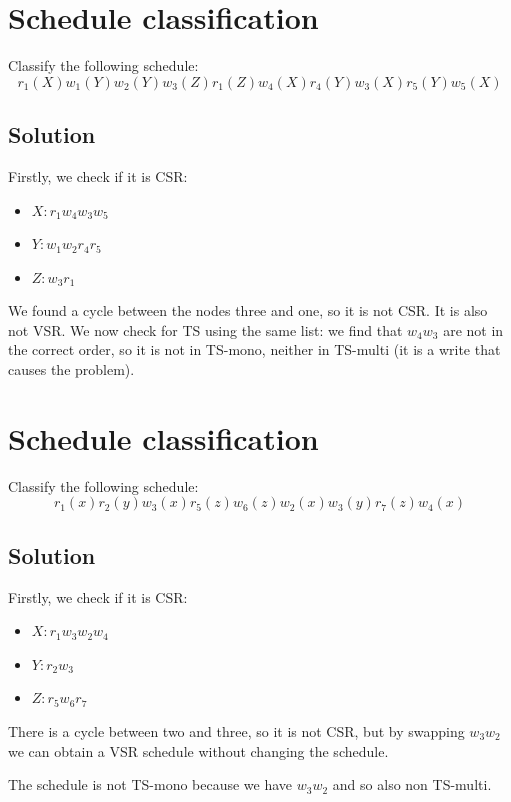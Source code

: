 \documentclass[12pt, a4paper]{report}
\newtheorem[style=M,bodystyle=\normalfont]{theorem}{Theorem}
\newtheorem[style=M,bodystyle=\normalfont]{corollary}{Corollary}
\newtheorem[style=M,bodystyle=\normalfont]{lemma}{Lemma}
\newtheorem[style=M,bodystyle=\normalfont]{definition}{Definition}
\begin{document}
    \newpage

    \section{Schedule classification}
        Classify the following schedule:
        \[r_1(X) w_1(Y) w_2(Y) w_3(Z) r_1(Z) w_4(X) r_4(Y) w_3(X) r_5(Y) w_5(X)\] 
    \subsection*{Solution}
        Firstly, we check if it is CSR:
        \begin{itemize}
            \item $X: r_1 w_4 w_3 w_5$
            \item $Y: w_1 w_2 r_4 r_5$
            \item $Z: w_3 r_1$
        \end{itemize}
        We found a cycle between the nodes three and one, so it is not CSR. It is also not VSR. We now check for TS using the same list: 
        we find that $w_4 w_3$ are not in the correct order, so it is not in TS-mono, neither in TS-multi (it is a write that causes the 
        problem).

    \newpage

    \section{Schedule classification}
        Classify the following schedule:
        \[r_1(x) r_2(y) w_3(x) r_5(z) w_6(z) w_2(x) w_3(y) r_7(z) w_4(x)\] 
    \subsection*{Solution}
        Firstly, we check if it is CSR:
        \begin{itemize}
            \item $X: r_1 w_3 w_2 w_4$
            \item $Y: r_2 w_3$
            \item $Z: r_5 w_6 r_7$
        \end{itemize}
        There is a cycle between two and three, so it is not CSR, but by swapping $w_3 w_2$ we can obtain a VSR schedule without changing the 
        schedule. 

        The schedule is not TS-mono because we have $w_3 w_2$ and so also non TS-multi. 

    \newpage
\end{document}
